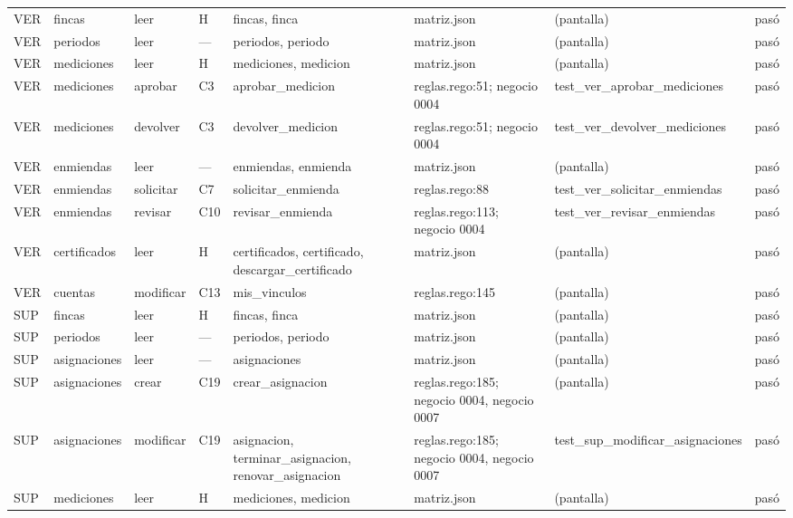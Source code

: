 \begin{center}
\begin{longtable}{@{}p{0.6cm} p{1.7cm} p{1.2cm} p{0.9cm} p{3.4cm} p{2.6cm} p{3.4cm} p{0.8cm}@{}}
VER & fincas & leer & H & fincas, \allowbreak{}finca & matriz.json & (pantalla) & pasó \\
VER & periodos & leer & — & periodos, \allowbreak{}periodo & matriz.json & (pantalla) & pasó \\
VER & mediciones & leer & H & mediciones, \allowbreak{}medicion & matriz.json & (pantalla) & pasó \\
VER & mediciones & aprobar & C3 & aprobar\_medicion & reglas.rego:51; negocio 0004 & test\_\allowbreak{}ver\_\allowbreak{}aprobar\_\allowbreak{}mediciones & pasó \\
VER & mediciones & devolver & C3 & devolver\_medicion & reglas.rego:51; negocio 0004 & test\_\allowbreak{}ver\_\allowbreak{}devolver\_\allowbreak{}mediciones & pasó \\
VER & enmiendas & leer & — & enmiendas, \allowbreak{}enmienda & matriz.json & (pantalla) & pasó \\
VER & enmiendas & solicitar & C7 & solicitar\_enmienda & reglas.rego:88 & test\_\allowbreak{}ver\_\allowbreak{}solicitar\_\allowbreak{}enmiendas & pasó \\
VER & enmiendas & revisar & C10 & revisar\_enmienda & reglas.rego:113; negocio 0004 & test\_\allowbreak{}ver\_\allowbreak{}revisar\_\allowbreak{}enmiendas & pasó \\
VER & certificados & leer & H & certificados, \allowbreak{}certificado, \allowbreak{}descargar\_certificado & matriz.json & (pantalla) & pasó \\
VER & cuentas & modificar & C13 & mis\_vinculos & reglas.rego:145 & (pantalla) & pasó \\
SUP & fincas & leer & H & fincas, \allowbreak{}finca & matriz.json & (pantalla) & pasó \\
SUP & periodos & leer & — & periodos, \allowbreak{}periodo & matriz.json & (pantalla) & pasó \\
SUP & asignaciones & leer & — & asignaciones & matriz.json & (pantalla) & pasó \\
SUP & asignaciones & crear & C19 & crear\_asignacion & reglas.rego:185; negocio 0004, negocio 0007 & (pantalla) & pasó \\
SUP & asignaciones & modificar & C19 & asignacion, \allowbreak{}terminar\_asignacion, \allowbreak{}renovar\_asignacion & reglas.rego:185; negocio 0004, negocio 0007 & test\_\allowbreak{}sup\_\allowbreak{}modificar\_\allowbreak{}asignaciones & pasó \\
SUP & mediciones & leer & H & mediciones, \allowbreak{}medicion & matriz.json & (pantalla) & pasó \\

\end{longtable}
\end{center}
